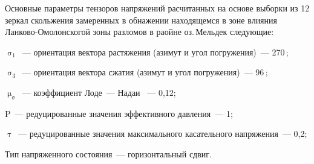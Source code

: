 Основные параметры тензоров напряжений расчитанных на основе выборки из 12 зеркал скольжения замеренных в обнажении находящемся в зоне влияния Ланково-Омолонскогой зоны разломов в раойне оз.\,Мельдек следующие:

\begin{description}[noitemsep]\vspace{-10pt}
\item $\upsigma_1$~--- ориентация вектора растяжения (азимут и угол погружения)~--- 270\dg\,;
\item $\upsigma_3$~--- ориентация вектора сжатия (азимут и угол погружения)~--- 96\dg\,;
\item $\upmu_\upsigma$~--- коэффициент Лоде~--- Надаи ~--- 0,12;
\item P~--- редуцированные значения эффективного давления~--- 1;
\item $\uptau$~--- редуцированные значения максимального касательного напряжения~--- 0,2;
\item Тип напряженного состояния~--- горизонтальный сдвиг.
\end{description}



%


